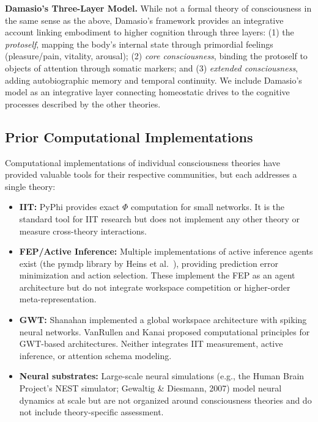 \textbf{Damasio's Three-Layer Model.} While not a formal theory of consciousness in the same sense as the above, Damasio's \cite{damasio1999,damasio2010} framework provides an integrative account linking embodiment to higher cognition through three layers: (1) the \textit{protoself}, mapping the body's internal state through primordial feelings (pleasure/pain, vitality, arousal); (2) \textit{core consciousness}, binding the protoself to objects of attention through somatic markers; and (3) \textit{extended consciousness}, adding autobiographic memory and temporal continuity. We include Damasio's model as an integrative layer connecting homeostatic drives to the cognitive processes described by the other theories.

\subsection{Prior Computational Implementations}

Computational implementations of individual consciousness theories have provided valuable tools for their respective communities, but each addresses a single theory:

\begin{itemize}
    \item \textbf{IIT:} PyPhi \cite{mayner2018} provides exact $\Phi$ computation for small networks. It is the standard tool for IIT research but does not implement any other theory or measure cross-theory interactions.

    \item \textbf{FEP/Active Inference:} Multiple implementations of active inference agents exist \cite{fountas2020,tschantz2020} (the pymdp library by Heins et al.\ \cite{heins2022}), providing prediction error minimization and action selection. These implement the FEP as an agent architecture but do not integrate workspace competition or higher-order meta-representation.

    \item \textbf{GWT:} Shanahan \cite{shanahan2008} implemented a global workspace architecture with spiking neural networks. VanRullen and Kanai \cite{vanrullen2021} proposed computational principles for GWT-based architectures. Neither integrates IIT measurement, active inference, or attention schema modeling.

    \item \textbf{Neural substrates:} Large-scale neural simulations (e.g., the Human Brain Project's NEST simulator; Gewaltig \& Diesmann, 2007) model neural dynamics at scale but are not organized around consciousness theories and do not include theory-specific assessment.
\end{itemize}

